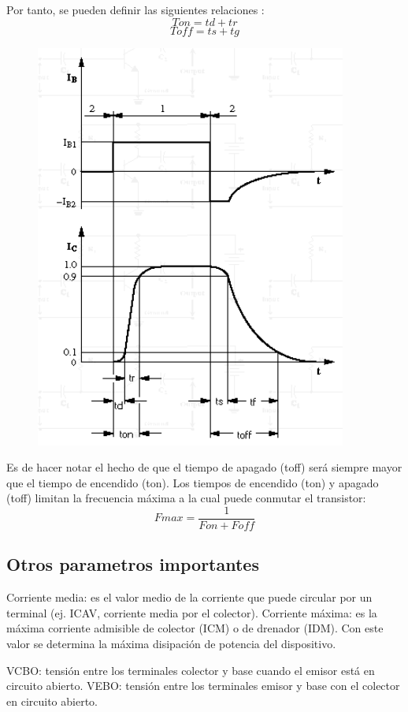\documentclass[12pt,a4paper]{article}
\begin{document}
Por tanto, se pueden definir las siguientes relaciones :
\begin{equation}
Ton= td+tr
\end{equation}
\begin{equation}
Toff= ts+tg
\end{equation}
\begin{figure}[h!]
\centering
\includegraphics[scale=1]{Captura10.PNG}  
\end{figure}
Es de hacer notar el hecho de que el tiempo de apagado (toff) será siempre mayor que el tiempo de encendido (ton).
Los tiempos de encendido (ton) y apagado (toff) limitan la frecuencia máxima a la cual puede conmutar el transistor:
\begin{equation}
Fmax= \frac{1}{Fon + Foff}
\end{equation}
\subsection{Otros parametros importantes}
Corriente media: es el valor medio de la corriente que puede circular por un terminal (ej. ICAV, corriente media por el colector).
Corriente máxima: es la máxima corriente admisible de colector (ICM) o de drenador (IDM). Con este valor se determina la máxima disipación de potencia del dispositivo.

VCBO: tensión entre los terminales colector y base cuando el emisor está en circuito abierto.
VEBO: tensión entre los terminales emisor y base con el colector en circuito abierto.
\end{document}
